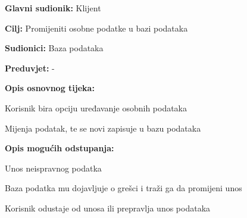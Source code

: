 					\pagebreak
					
					\noindent {}
					\begin{packed_item}
	
						\item \textbf{Glavni sudionik: }Klijent
						\item  \textbf{Cilj:} Promijeniti osobne podatke u bazi podataka
						\item  \textbf{Sudionici:} Baza podataka
						\item  \textbf{Preduvjet:} -
						\item  \textbf{Opis osnovnog tijeka:}
						
						\item[] \begin{packed_enum}
	
							\item Korisnik bira opciju uređavanje osobnih podataka
							\item Mijenja podatak, te se novi zapisuje u bazu podataka

						\end{packed_enum}
						\item  \textbf{Opis mogućih odstupanja:}
						
						\item[] \begin{packed_item}
	
							\item[2.a] Unos neispravnog podatka
							\item[] \begin{packed_enum}
								
								\item Baza podatka mu dojavljuje o grešci i traži ga da promijeni unos	
								\item Korisnik odustaje od unosa ili prepravlja unos podataka
							\end{packed_enum}
						\end{packed_item}
						
					\end{packed_item}
					
